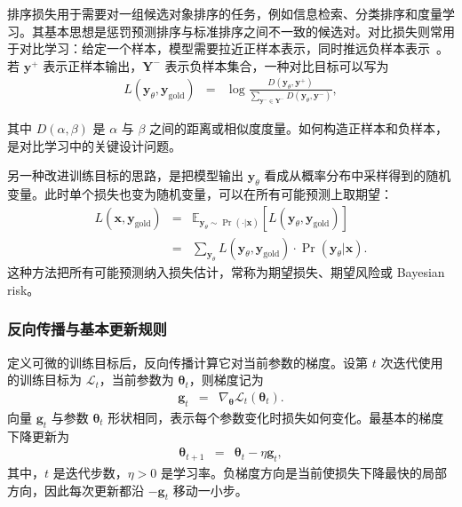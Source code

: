 排序损失用于需要对一组候选对象排序的任务，例如信息检索、分类排序和度量学习。其基本思想是惩罚预测排序与标准排序之间不一致的候选对。对比损失则常用于对比学习：给定一个样本，模型需要拉近正样本表示，同时推远负样本表示~\cite{OordEtAl2018CPC,ChenEtAl2020SimCLR}。若 $\mathbf{y}^{+}$ 表示正样本输出，$\mathbf{Y}^{-}$ 表示负样本集合，一种对比目标可以写为
\begin{eqnarray}
L(\mathbf{y}_{\theta},\mathbf{y}_{\mathrm{gold}})
& = &
\log
\frac{D(\mathbf{y}_{\theta},\mathbf{y}^{+})}
{\sum_{\mathbf{y}^{-}\in \mathbf{Y}^{-}}D(\mathbf{y}_{\theta},\mathbf{y}^{-})},
\end{eqnarray}

\noindent 其中 $D(\alpha,\beta)$ 是 $\alpha$ 与 $\beta$ 之间的距离或相似度度量。如何构造正样本和负样本，是对比学习中的关键设计问题。

另一种改进训练目标的思路，是把模型输出 $\mathbf{y}_{\theta}$ 看成从概率分布中采样得到的随机变量。此时单个损失也变为随机变量，可以在所有可能预测上取期望：
\begin{eqnarray}
L(\mathbf{x},\mathbf{y}_{\mathrm{gold}})
& = &
\mathbb{E}_{\mathbf{y}_{\theta}\sim\Pr(\cdot|\mathbf{x})}
\left[
L(\mathbf{y}_{\theta},\mathbf{y}_{\mathrm{gold}})
\right] \nonumber \\
& = &
\sum_{\mathbf{y}_{\theta}}
L(\mathbf{y}_{\theta},\mathbf{y}_{\mathrm{gold}})
\cdot
\Pr(\mathbf{y}_{\theta}|\mathbf{x}).
\end{eqnarray}
这种方法把所有可能预测纳入损失估计，常称为期望损失、期望风险或 Bayesian risk。

\subsubsection{反向传播与基本更新规则}

定义可微的训练目标后，反向传播计算它对当前参数的梯度。设第 $t$ 次迭代使用的训练目标为 $\mathcal{L}_t$，当前参数为 $\boldsymbol{\theta}_t$，则梯度记为
\begin{eqnarray}
\mathbf{g}_t
& = &
\nabla_{\boldsymbol{\theta}}
\mathcal{L}_t(\boldsymbol{\theta}_t).
\end{eqnarray}
向量 $\mathbf{g}_t$ 与参数 $\boldsymbol{\theta}_t$ 形状相同，表示每个参数变化时损失如何变化。最基本的梯度下降更新为
\begin{eqnarray}
\boldsymbol{\theta}_{t+1}
& = &
\boldsymbol{\theta}_t-\eta\mathbf{g}_t,
\end{eqnarray}
其中，$t$ 是迭代步数，$\eta>0$ 是学习率。负梯度方向是当前使损失下降最快的局部方向，因此每次更新都沿 $-\mathbf{g}_t$ 移动一小步。

